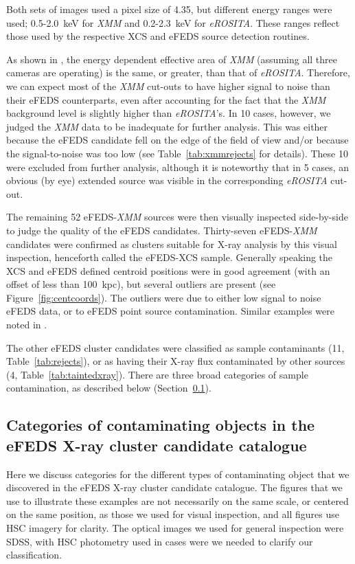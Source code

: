 \documentclass[fleqn,usenatbib]{mnras}
\begin{document}
Both sets of images used a pixel size of 4.35\arcsec, but different energy ranges were used; 0.5-2.0~keV for {\em XMM} and 0.2-2.3~keV for {\em eROSITA}. These ranges reflect those used by the respective XCS and eFEDS source detection routines.  

As shown in \cite{missionpaper}, the energy dependent effective area of {\em XMM} (assuming all three cameras are operating) is the same, or greater, than that of {\em eROSITA}. Therefore, we can expect most of the {\em XMM} cut-outs to have higher signal to noise than their eFEDS counterparts, even after accounting for the fact that the {\em XMM} background level is slightly higher than {\em eROSITA}'s. In 10 cases, however, we judged the {\em XMM} data to be inadequate for further analysis. This was either because the eFEDS candidate fell on the edge of the field of view and/or because the signal-to-noise was too low (see Table~\ref{tab:xmmrejects} for details). These 10 were excluded from further analysis, although it is noteworthy that in 5 cases, an obvious (by eye) extended source was visible in the corresponding {\em eROSITA} cut-out.

The remaining 52 eFEDS-{\em XMM} sources were then visually inspected side-by-side to judge the quality of the eFEDS candidates. Thirty-seven eFEDS-{\em XMM} candidates were confirmed as clusters suitable for X-ray analysis by this visual inspection, henceforth called the eFEDS-XCS sample. Generally speaking the XCS and eFEDS defined centroid positions were in good agreement (with an offset of less than 100~kpc), but several outliers are present (see Figure~\ref{fig:centcoords}). The outliers were due to either low signal to noise eFEDS data, or to eFEDS point source contamination. Similar examples were noted in \cite{efedsclusteropticalcat}. 

The other eFEDS cluster candidates were classified as sample contaminants (11, Table~\ref{tab:rejects}), or as having their X-ray flux contaminated by other sources (4, Table~\ref{tab:taintedxray}). There are three broad categories of sample contamination, as described below (Section~\ref{sec:examplerejects}).

\subsection{Categories of contaminating objects in the eFEDS X-ray cluster candidate catalogue}
\label{sec:examplerejects}
Here we discuss categories for the different types of contaminating object that we discovered in the eFEDS X-ray cluster candidate catalogue. The figures that we use to illustrate these examples are not necessarily on the same scale, or centered on the same position, as those we used for visual inspection, and all figures use HSC imagery for clarity. The optical images we used for general inspection were SDSS, with HSC photometry used in cases were we needed to clarify our classification.
\end{document}

